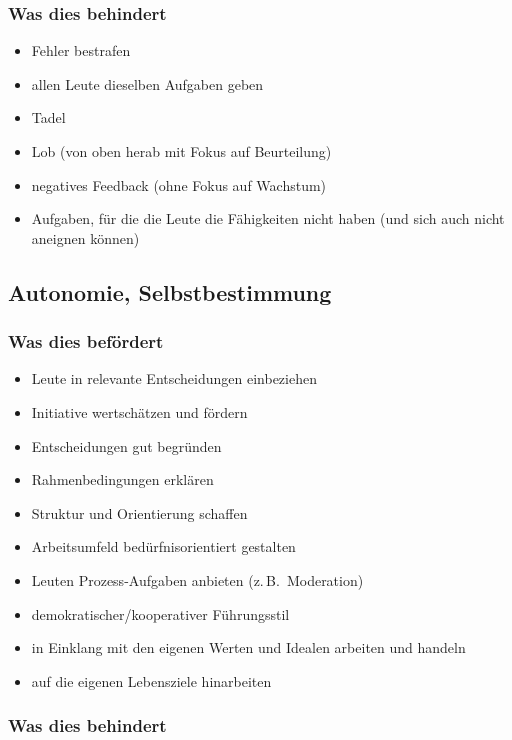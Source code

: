 \subsubsection{Was dies behindert}

\begin{itemize}
  \item Fehler bestrafen
  \item allen Leute dieselben Aufgaben geben
  \item Tadel
  \item Lob (von oben herab mit Fokus auf Beurteilung)
  \item negatives Feedback (ohne Fokus auf Wachstum)
  \item Aufgaben, für die die Leute die Fähigkeiten nicht haben (und sich auch nicht aneignen können)
\end{itemize}



\subsection{Autonomie, Selbstbestimmung}

\subsubsection{Was dies befördert}

\begin{itemize}
  \item Leute in relevante Entscheidungen einbeziehen
  \item Initiative wertschätzen und fördern
  \item Entscheidungen gut begründen
  \item Rahmenbedingungen erklären
  \item Struktur und Orientierung schaffen
  \item Arbeitsumfeld bedürfnisorientiert gestalten
  \item Leuten Prozess-Aufgaben anbieten (z.\,B.~Moderation)
  \item demokratischer/kooperativer Führungsstil
  \item in Einklang mit den eigenen Werten und Idealen arbeiten und handeln
  \item auf die eigenen Lebensziele hinarbeiten
\end{itemize}

\subsubsection{Was dies behindert}

